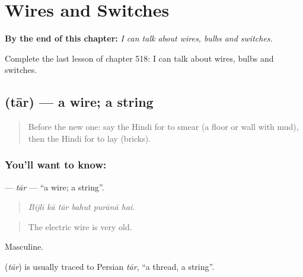 
\chapter{Wires and Switches}
\label{ch:hi-wires-and-switches}

\begin{chapteropening}
\textbf{By the end of this chapter:} \emph{I can talk about wires, bulbs and switches.}

Complete the last lesson of chapter 518: I can talk about wires, bulbs and switches.
\end{chapteropening}

\section[\texorpdfstring{\hi{तार} (tār)}{तार (tār)}]{ (tār) — a wire; a string}

\label{lesson:HI-C518-tar}



\begin{quote}
Before the new one: say the Hindi for to smear (a floor or wall with mud), then the Hindi for to lay (bricks).
\end{quote}

\subsection*{You'll want to know: }
\textbf{} — \emph{tār} — \textquotedblleft{}a wire; a string\textquotedblright{}.

\begin{quote}
     
\end{quote}

\begin{quote}
\emph{Bijlī kā tār bahut purānā hai.}
\end{quote}

\begin{quote}
The electric wire is very old.
\end{quote}

Masculine.

\begin{cousinweb}
\textbf{} (\emph{tār}) is usually traced to Persian \emph{tār}, \textquotedblleft{}a thread, a string\textquotedblright{}.
\end{cousinweb}

